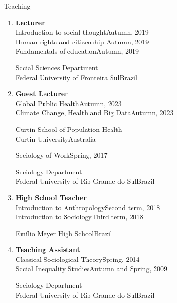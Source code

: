 \begin{rSection}{Teaching}

\begin{enumerate}[label=\Roman*]

\item \textbf{Lecturer}
\\
{Introduction to social thought}\hfill{Autumn, 2019}\\
{Human rights and citizenship }\hfill{Autumn, 2019}\\
{Fundamentals of education}\hfill{Autumn, 2019}\par
{Social Sciences Department}\\
{Federal University of Fronteira Sul}\hfill{Brazil}\\

\item \textbf{Guest Lecturer}\\
{Global Public Health}\hfill{Autumn, 2023}\\
{Climate Change, Health and Big Data}\hfill{Autumn, 2023}\par
{Curtin School of Population Health}\\
{Curtin University}\hfill{Australia}

\vspace{1.5em}

{Sociology of Work}\hfill{Spring, 2017}\par
{Sociology Department}\\
{Federal University of Rio Grande do Sul}\hfill{Brazil}\\

\item{\textbf {High School Teacher}}\\
{Introduction to Anthropology}\hfill{Second term, 2018}\\
{Introduction to Sociology}\hfill{Third term, 2018}\par
{Emílio Meyer High School}\hfill{Brazil}\\

\item \textbf{Teaching Assistant}\\
{Classical Sociological Theory}\hfill{Spring, 2014}\\
{Social Inequality Studies}\hfill{Autumn and Spring, 2009}\par
{Sociology Department}\\
{Federal University of Rio Grande do Sul}\hfill{Brazil}

\end{enumerate}

\end{rSection}